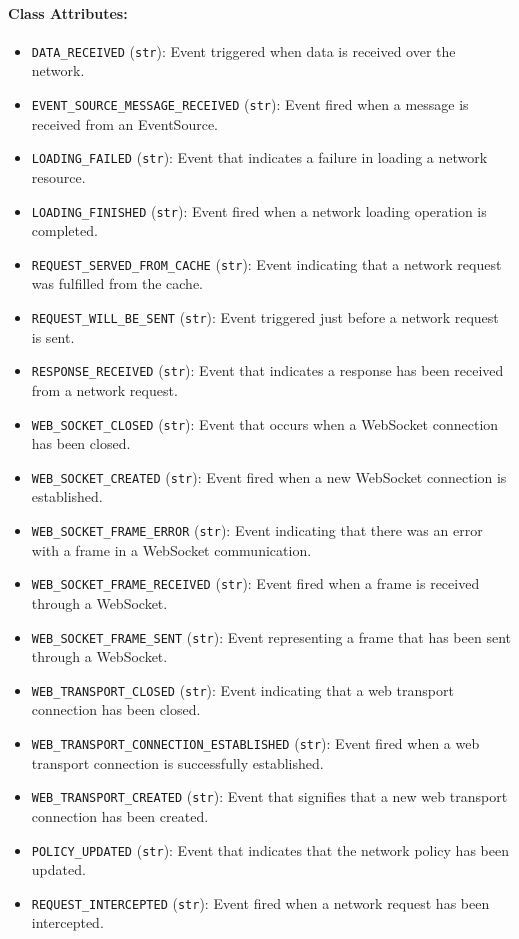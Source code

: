 \documentclass{article}
\begin{document}
\paragraph{Class Attributes:}
\begin{itemize}
    \item \texttt{DATA\_RECEIVED} (\texttt{str}): Event triggered when data is received over the network.
    \item \texttt{EVENT\_SOURCE\_MESSAGE\_RECEIVED} (\texttt{str}): Event fired when a message is received from an EventSource.
    \item \texttt{LOADING\_FAILED} (\texttt{str}): Event that indicates a failure in loading a network resource.
    \item \texttt{LOADING\_FINISHED} (\texttt{str}): Event fired when a network loading operation is completed.
    \item \texttt{REQUEST\_SERVED\_FROM\_CACHE} (\texttt{str}): Event indicating that a network request was fulfilled from the cache.
    \item \texttt{REQUEST\_WILL\_BE\_SENT} (\texttt{str}): Event triggered just before a network request is sent.
    \item \texttt{RESPONSE\_RECEIVED} (\texttt{str}): Event that indicates a response has been received from a network request.
    \item \texttt{WEB\_SOCKET\_CLOSED} (\texttt{str}): Event that occurs when a WebSocket connection has been closed.
    \item \texttt{WEB\_SOCKET\_CREATED} (\texttt{str}): Event fired when a new WebSocket connection is established.
    \item \texttt{WEB\_SOCKET\_FRAME\_ERROR} (\texttt{str}): Event indicating that there was an error with a frame in a WebSocket communication.
    \item \texttt{WEB\_SOCKET\_FRAME\_RECEIVED} (\texttt{str}): Event fired when a frame is received through a WebSocket.
    \item \texttt{WEB\_SOCKET\_FRAME\_SENT} (\texttt{str}): Event representing a frame that has been sent through a WebSocket.
    \item \texttt{WEB\_TRANSPORT\_CLOSED} (\texttt{str}): Event indicating that a web transport connection has been closed.
    \item \texttt{WEB\_TRANSPORT\_CONNECTION\_ESTABLISHED} (\texttt{str}): Event fired when a web transport connection is successfully established.
    \item \texttt{WEB\_TRANSPORT\_CREATED} (\texttt{str}): Event that signifies that a new web transport connection has been created.
    \item \texttt{POLICY\_UPDATED} (\texttt{str}): Event that indicates that the network policy has been updated.
    \item \texttt{REQUEST\_INTERCEPTED} (\texttt{str}): Event fired when a network request has been intercepted.
\end{itemize}
\end{document}
